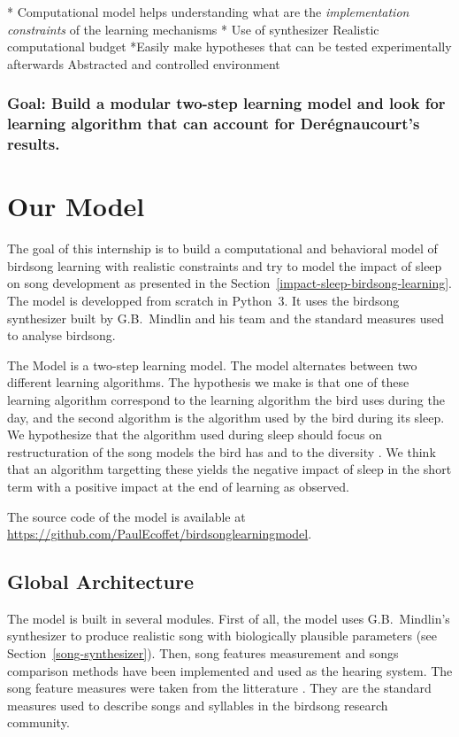 \documentclass{report}
\begin{document}
  * Computational model helps understanding what are the \emph{implementation
  constraints} of the learning mechanisms
  * Use of synthesizer Realistic computational budget
  *Easily make hypotheses that can be tested experimentally afterwards
  Abstracted and controlled environment

\subsection{Goal: Build a modular two-step learning model and look for learning
algorithm that can account for Derégnaucourt's results.}
\label{goal-build-a-modular-two-step-learning-model}

\chapter{Our Model} \label{our-model}

The goal of this internship is to build a computational and behavioral model of
birdsong learning with realistic constraints and try to model the impact of
sleep on song development as presented in the
Section~\ref{impact-sleep-birdsong-learning}. The model is developped from
scratch in Python~3. It uses the birdsong synthesizer built by G.B.~Mindlin and
his team and the standard measures used to analyse birdsong.

The Model is a two-step learning model. The model alternates between two
different learning algorithms. The hypothesis we make is that one of
these learning algorithm correspond to the learning algorithm the bird uses
during the day, and  the second algorithm is the algorithm used by the bird
during its sleep. We hypothesize that the algorithm used during sleep should
focus on restructuration of the song models the bird has and to the diversity
\todo{}. We think that an algorithm targetting these \todo{} yields the negative
impact of sleep in the short term with a positive impact at the end of learning
as \textcite{deregnaucourt_how_2005} observed.

The source code of the model is available at
\url{https://github.com/PaulEcoffet/birdsonglearningmodel}.

\section{Global Architecture} \label{global-architecture}

The model is built in several modules. First of all, the model uses
G.B.~Mindlin's synthesizer to produce realistic song with biologically
plausible parameters (see Section~\ref{song-synthesizer}). Then, song features
measurement and songs comparison methods have been implemented and used as the
hearing system. The song feature measures were taken from the litterature
\parencite{tchernichovski_procedure_2000}. They are the standard measures used
to describe songs and syllables in the birdsong research community.
\end{document}
